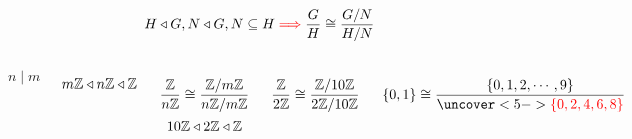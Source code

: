 \begin{frame}
  \begin{theorem}
	\[
	  H \triangleleft G, N \triangleleft G, N \subseteq H \textcolor{red}{\implies} \frac{G}{H} \cong \frac{G/N}{H/N}
	\]
  \end{theorem}

  \vspace{0.60cm}
  \begin{columns}
	  \[
		n \mid m
	  \]

	  \[
		m\mathbb{Z} \triangleleft n\mathbb{Z} \triangleleft \mathbb{Z}
	  \]

	  \pause
	  \[
		\frac{\mathbb{Z}}{n\mathbb{Z}} \cong \frac{\mathbb{Z}/m\mathbb{Z}}{n\mathbb{Z}/m\mathbb{Z}}
	  \]
	  \pause
	  \[
		10\mathbb{Z} \triangleleft 2\mathbb{Z} \triangleleft \mathbb{Z}
	  \]

	  \[
		\frac{\mathbb{Z}}{2\mathbb{Z}} \cong \frac{\mathbb{Z}/10\mathbb{Z}}{2\mathbb{Z}/10\mathbb{Z}}
	  \]

	  \pause
	  \[
		\set{0,1} \cong \frac{\set{0, 1, 2, \cdots, 9}}{\uncover<5->{\red{\set{0, 2, 4, 6, 8}}}}
	  \]
  \end{columns}
\end{frame}

